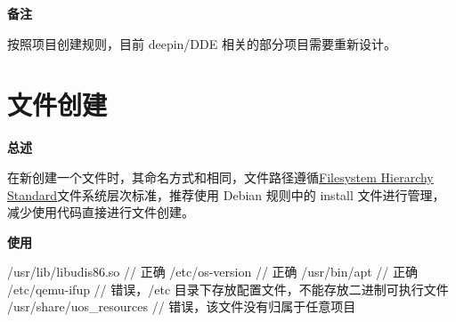 

\textbf{备注}

按照项目创建规则，目前 deepin/DDE 相关的部分项目需要重新设计。

\section{文件创建}

\textbf{总述}

在新创建一个文件时，其命名方式和相同，文件路径遵循\href{https://refspecs.linuxfoundation.org/FHS_3.0/fhs-3.0.html}{Filesystem Hierarchy Standard}文件系统层次标准，推荐使用 Debian 规则中的 install 文件进行管理，减少使用代码直接进行文件创建。

\textbf{使用}

\begin{cppcode}
  /usr/lib/libudis86.so       // 正确
  /etc/os-version             // 正确
  /usr/bin/apt                // 正确
  /etc/qemu-ifup              // 错误，/etc 目录下存放配置文件，不能存放二进制可执行文件
  /usr/share/uos_resources    // 错误，该文件没有归属于任意项目
\end{cppcode}